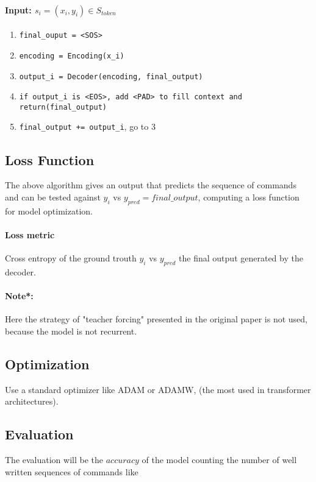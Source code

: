 \documentclass[]{article}
\begin{document}
\paragraph*{Input: $s_i = (x_i, y_i) \in S_{token}$}
\begin{enumerate}
    \item \texttt{final\_ouput = <SOS>}
    \item \texttt{encoding = Encoding(x\_i)}
    \item \texttt{output\_i = Decoder(encoding, final\_output)}
    \item \texttt{if output\_i is <EOS>, add <PAD> to fill context and return(final\_output)}
    \item \texttt{final\_output += output\_i}, go to 3
\end{enumerate}

\subsection*{Loss Function}
The above algorithm gives an output that predicts the sequence of commands and can be tested against $y_i$ vs $y_{pred} = final\_output$, computing a loss function for model optimization.

\paragraph*{Loss metric} Cross entropy of the ground trouth $y_i$ vs $y_{pred}$ the final output generated by the decoder.

\paragraph*{Note*:} Here the strategy of "teacher forcing" presented in the original paper is not used, because the model is not recurrent.


\subsection*{Optimization}

Use a standard optimizer like ADAM or ADAMW, (the most used in transformer architectures).

\subsection*{Evaluation}
The evaluation will be the $accuracy$ of the model counting the number of well written sequences of commands like
\end{document}
